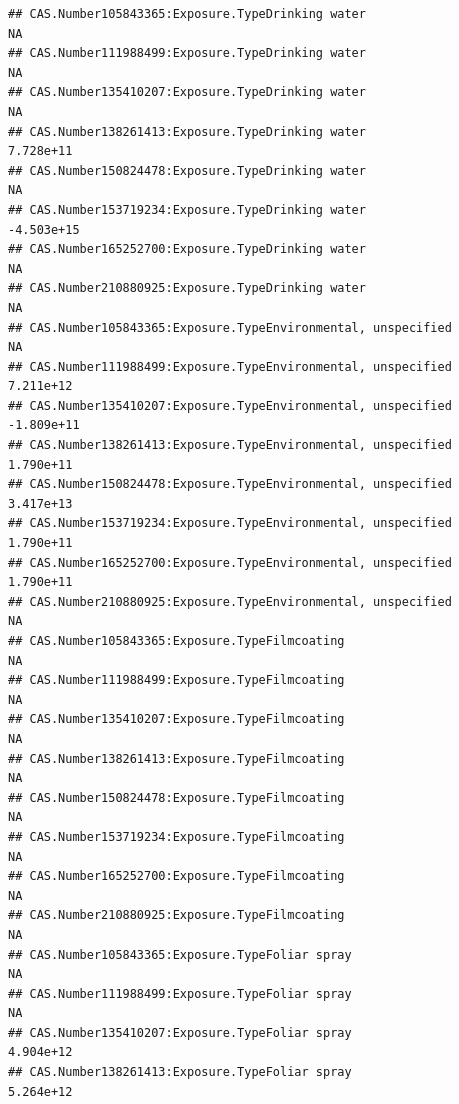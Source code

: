 \documentclass[
  12pt,
]{article}
\begin{document}
\begin{verbatim}
## CAS.Number105843365:Exposure.TypeDrinking water                                         NA
## CAS.Number111988499:Exposure.TypeDrinking water                                         NA
## CAS.Number135410207:Exposure.TypeDrinking water                                         NA
## CAS.Number138261413:Exposure.TypeDrinking water                                  7.728e+11
## CAS.Number150824478:Exposure.TypeDrinking water                                         NA
## CAS.Number153719234:Exposure.TypeDrinking water                                 -4.503e+15
## CAS.Number165252700:Exposure.TypeDrinking water                                         NA
## CAS.Number210880925:Exposure.TypeDrinking water                                         NA
## CAS.Number105843365:Exposure.TypeEnvironmental, unspecified                             NA
## CAS.Number111988499:Exposure.TypeEnvironmental, unspecified                      7.211e+12
## CAS.Number135410207:Exposure.TypeEnvironmental, unspecified                     -1.809e+11
## CAS.Number138261413:Exposure.TypeEnvironmental, unspecified                      1.790e+11
## CAS.Number150824478:Exposure.TypeEnvironmental, unspecified                      3.417e+13
## CAS.Number153719234:Exposure.TypeEnvironmental, unspecified                      1.790e+11
## CAS.Number165252700:Exposure.TypeEnvironmental, unspecified                      1.790e+11
## CAS.Number210880925:Exposure.TypeEnvironmental, unspecified                             NA
## CAS.Number105843365:Exposure.TypeFilmcoating                                            NA
## CAS.Number111988499:Exposure.TypeFilmcoating                                            NA
## CAS.Number135410207:Exposure.TypeFilmcoating                                            NA
## CAS.Number138261413:Exposure.TypeFilmcoating                                            NA
## CAS.Number150824478:Exposure.TypeFilmcoating                                            NA
## CAS.Number153719234:Exposure.TypeFilmcoating                                            NA
## CAS.Number165252700:Exposure.TypeFilmcoating                                            NA
## CAS.Number210880925:Exposure.TypeFilmcoating                                            NA
## CAS.Number105843365:Exposure.TypeFoliar spray                                           NA
## CAS.Number111988499:Exposure.TypeFoliar spray                                           NA
## CAS.Number135410207:Exposure.TypeFoliar spray                                    4.904e+12
## CAS.Number138261413:Exposure.TypeFoliar spray                                    5.264e+12

\end{verbatim}
\end{document}

